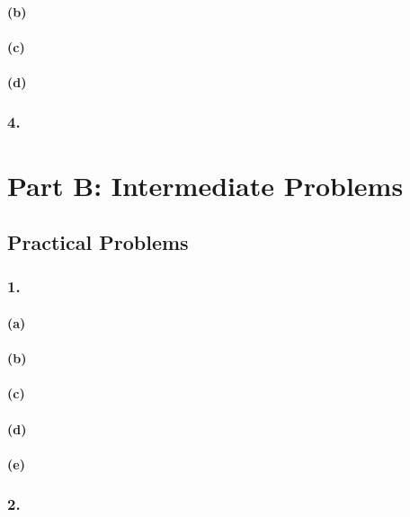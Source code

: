 \documentclass[12pt]{report}
\begin{document}
\subsubsection*{(b)}

\subsubsection*{(c)}

\subsubsection*{(d)}

\subsection*{4.}

\chapter*{Part B: Intermediate Problems}
\section*{Practical Problems}
\subsection*{1.}
\subsubsection*{(a)}

\subsubsection*{(b)}

\subsubsection*{(c)}

\subsubsection*{(d)}

\subsubsection*{(e)}

\subsection*{2.}
\end{document}
